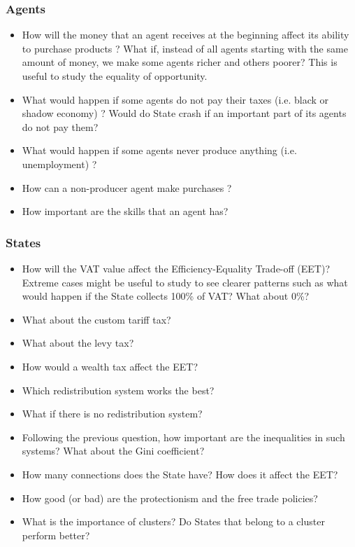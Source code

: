 \subsubsection{Agents}

\begin{itemize}
    \item How will the money that an agent receives at the beginning affect its ability to purchase products ? What if, instead of all agents starting with the same amount of money, we make some agents richer and others poorer? This is useful to study the equality of opportunity.
    \item What would happen if some agents do not pay their taxes (i.e. black or shadow economy) ? Would do State crash if an important part of its agents do not pay them? 
    \item What would happen if some agents never produce anything (i.e. unemployment) ?
    \item How can a non-producer agent make purchases ?
    \item How important are the skills that an agent has? 
\end{itemize}

\subsubsection{States}

\begin{itemize}
    \item How will the VAT value affect the Efficiency-Equality Trade-off (EET)? Extreme cases might be useful to study to see clearer patterns such as what would happen if the State collects 100\% of VAT? What about 0\%?
    \item What about the custom tariff tax?
    \item What about the levy tax?
    \item How would a wealth tax affect the EET?
    \item Which redistribution system works the best?
    \item What if there is no redistribution system?
    \item Following the previous question, how important are the inequalities in such systems? What about the Gini coefficient? 
    \item How many connections does the State have? How does it affect the EET?
    \item How good (or bad) are the protectionism and the free trade policies?
    \item What is the importance of clusters? Do States that belong to a cluster perform better?
\end{itemize}

